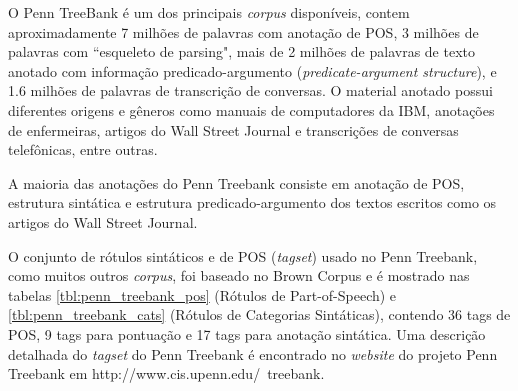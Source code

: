 O Penn TreeBank é um dos principais \emph{corpus} disponíveis, contem aproximadamente 7 milhões de palavras com anotação de POS, 3 milhões de palavras com ``esqueleto de parsing", mais de 2 milhões de palavras de texto anotado com informação predicado-argumento (\emph{predicate-argument structure}), e 1.6 milhões de palavras de transcrição de conversas. O material anotado possui diferentes origens e gêneros como manuais de computadores da IBM, anotações de enfermeiras, artigos do Wall Street Journal e transcrições de conversas telefônicas, entre outras.

A maioria das anotações do Penn Treebank consiste em anotação de POS, estrutura sintática e estrutura predicado-argumento dos textos escritos como os artigos do Wall Street Journal.

O conjunto de rótulos sintáticos e de POS (\emph{tagset}) usado no Penn Treebank, como muitos outros \emph{corpus}, foi baseado no Brown Corpus e é mostrado nas tabelas \ref{tbl:penn_treebank_pos} (Rótulos de Part-of-Speech) e \ref{tbl:penn_treebank_cats} (Rótulos de Categorias Sintáticas), contendo 36 tags de POS, 9 tags para pontuação e 17 tags para anotação sintática. Uma descrição detalhada do \emph{tagset} do Penn Treebank é encontrado no \emph{website} do projeto Penn Treebank em http://www.cis.upenn.edu/~treebank.

